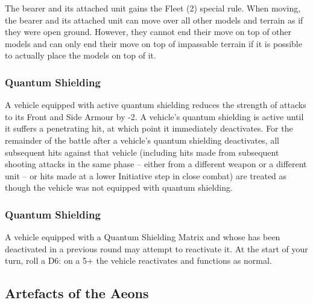 The bearer and its attached unit gains the Fleet (2) special rule. When moving, the bearer and its attached unit can move over all other models and terrain as if they were open ground. However, they cannot end their move on top of other models and can only end their move on top of impassable terrain if it is possible to actually place the models on top of it.

\subsubsection{Quantum Shielding} \label{Quantum Shielding}

A vehicle equipped with active quantum shielding reduces the strength of attacks to its Front and Side Armour by -2. A vehicle’s quantum shielding is active until it suffers a penetrating hit, at which point it immediately
deactivates. For the remainder of the battle after a vehicle’s quantum shielding deactivates, all subsequent hits against that vehicle (including hits made from subsequent shooting attacks in the same phase – either
from a different weapon or a different unit – or hits made at a lower Initiative step in close combat) are treated as though the vehicle was not equipped with quantum shielding.

\subsubsection{Quantum Shielding} \label{Quantum Shielding Matrix}

A vehicle equipped with a Quantum Shielding Matrix and  whose  has been deactivated in a previous round may attempt to reactivate it. At the start of your turn, roll a D6: on a 5+ the vehicle  reactivates and functions as normal.

\subsection{Artefacts of the Aeons} \label{Artefacts of the Aeons}

